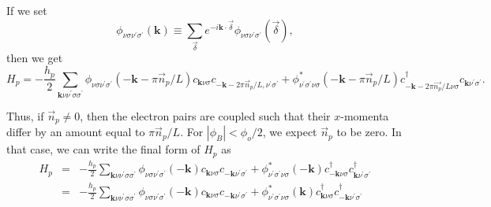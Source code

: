 If we set
\begin{equation}
\phi_{\nu\sigma\nu^{\prime}\sigma^{\prime}}(\mathbf{k}) \equiv \sum_{\vec{\delta}}
e^{-i \mathbf{k}\cdot\vec{\delta}}
\phi_{\nu\sigma\nu^{\prime}\sigma^{\prime}}(\vec{\delta}), 
\end{equation}
then we get
\begin{equation}
H_p = - \frac{h_p}{2} \sum_{\mathbf{k}\nu\nu^{\prime}\sigma\sigma^{\prime}} 
\phi_{\nu\sigma\nu^{\prime}\sigma^{\prime}}(-\mathbf{k}-\pi\vec{n}_p/L)
c_{\mathbf{k}\nu\sigma} 
c_{-\mathbf{k} - 2\pi \vec{n}_p/L,\nu^{\prime}\sigma^{\prime}}
+  \phi_{\nu^{\prime}\sigma^{\prime}\nu\sigma}^*(-\mathbf{k}-\pi\vec{n}_p/L)     
c^{\dagger}_{-\mathbf{k} - 2\pi\vec{n_p}/L\nu\sigma}
c_{\mathbf{k}\nu^{\prime}\sigma^{\prime}}.
\end{equation}

Thus, if $\vec{n}_p \neq 0$, then the electron pairs are
coupled such that their $x$-momenta differ by an amount equal
to $\pi \vec{n}_p/L$.  
For $|\phi_B| < \phi_o / 2$,
we expect $\vec{n}_p$ to be zero.  In that case, we
can write the final form of $H_p$ as
\begin{eqnarray}
H_p & = & - \frac{h_p}{2} \sum_{\mathbf{k}\nu\nu^{\prime}\sigma\sigma^{\prime}} 
\phi_{\nu\sigma\nu^{\prime}\sigma^{\prime}}(-\mathbf{k})
  c_{\mathbf{k}\nu\sigma}
  c_{-\mathbf{k}\nu^{\prime}\sigma^{\prime}}
+ \phi_{\nu^{\prime}\sigma^{\prime}\nu\sigma}^*(-\mathbf{k}) 
  c^{\dagger}_{-\mathbf{k}\nu\sigma}
  c^{\dagger}_{\mathbf{k}\nu^{\prime}\sigma^{\prime}}\\
 & = & - \frac{h_p}{2} \sum_{\mathbf{k}\nu\nu^{\prime}\sigma\sigma^{\prime}} 
\phi_{\nu\sigma\nu^{\prime}\sigma^{\prime}}(-\mathbf{k})
  c_{\mathbf{k}\nu\sigma}
  c_{-\mathbf{k}\nu^{\prime}\sigma^{\prime}}
+ \phi_{\nu^{\prime}\sigma^{\prime}\nu\sigma}^*(\mathbf{k}) 
  c^{\dagger}_{\mathbf{k}\nu\sigma}
  c^{\dagger}_{-\mathbf{k}\nu^{\prime}\sigma^{\prime}}
\end{eqnarray}


